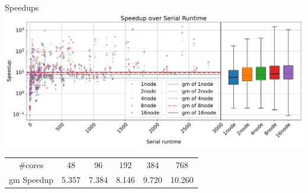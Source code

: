 \documentclass{beamer}
\begin{document}
\begin{frame}{Speedups}
    \center
    \includegraphics[scale=.3]{plots/speedups_gim.pdf}
    
    \begin{table}[!h]
        \center
        \begin{tabular}{ cccccc }
          \toprule
          \#cores & 48 & 96 & 192 & 384 & 768 \\
          gm Speedup & 5.357 & 7.384 & 8.146 & 9.720 & 10.260 \\
          \bottomrule
        \end{tabular}
    \end{table}
\end{frame}
\end{document}
